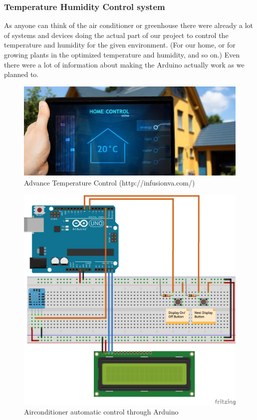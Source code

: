 \documentclass[conference]{IEEEtran}
\begin{document}
\subsubsection{Temperature Humidity Control system}
As anyone can think of the air conditioner or greenhouse there were already a lot of systems and devices doing the actual part of our project to control the temperature and humidity for the given environment. (For our home, or for growing plants in the optimized temperature and humidity, and so on.) Even there were a lot of information about making the Arduino actually work as we planned to.
\begin{figure}[htbp]
\begin{center}
    \includegraphics[scale=1.2]{temperature_control}
    \caption{Advance Temperature Control (http://infusionva.com/)} \label{fig:label}
\end{center}
\end{figure}

\begin{figure}[htbp]
\begin{center}
    \includegraphics[scale=0.4]{arduino}
    \caption{Airconditioner automatic control through Arduino} \label{fig:label}
\end{center}
\end{figure}
\end{document}
